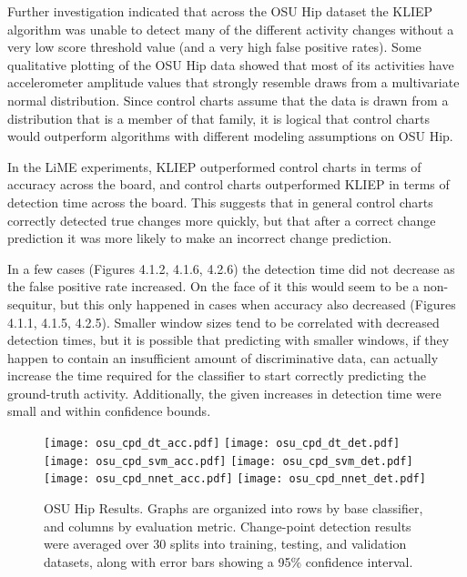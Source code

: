 Further investigation indicated that across the OSU Hip dataset the KLIEP algorithm
was unable to detect many of the different activity changes without a very low score
threshold value (and a very high false positive rates).
Some qualitative plotting of the OSU Hip data showed
that most of its activities have accelerometer amplitude values that strongly
resemble draws from a multivariate normal distribution. Since control charts
assume that the data is drawn from a distribution that is a member of that
family, it is logical that control charts would outperform algorithms with
different modeling assumptions on OSU Hip.

In the LiME experiments, KLIEP outperformed control charts in terms of
accuracy across the board, and control charts outperformed KLIEP in terms of
detection time across the board. This suggests that in general control charts
correctly detected true changes more quickly, but that after a correct change
prediction it was more likely to make an incorrect change prediction.

In a few cases (Figures 4.1.2, 4.1.6, 4.2.6) the detection time did
not decrease as the false positive rate increased. On the face of it this would seem
to be a non-sequitur, but this only happened in cases when accuracy also decreased
(Figures 4.1.1, 4.1.5, 4.2.5).
Smaller window sizes tend to be correlated with decreased detection times, but
it is possible that predicting with smaller windows, if they happen to contain
an insufficient amount of discriminative data,
can actually increase the time required for the classifier to start correctly
predicting the ground-truth activity. Additionally, the given increases in detection
time were small and within confidence bounds.

\begin{figure}[H]
 \texttt{[image: osu\_cpd\_dt\_acc.pdf]} \hspace{1em}\vspace{1em}
 \texttt{[image: osu\_cpd\_dt\_det.pdf]}
 \texttt{[image: osu\_cpd\_svm\_acc.pdf]} \hspace{1em}\vspace{1em}
 \texttt{[image: osu\_cpd\_svm\_det.pdf]}
 \texttt{[image: osu\_cpd\_nnet\_acc.pdf]} \hspace{2em}
 \texttt{[image: osu\_cpd\_nnet\_det.pdf]}
 \caption{OSU Hip Results. Graphs are organized into rows by base classifier,
  and columns by evaluation metric. Change-point detection results were averaged over
  30 splits into training, testing, and validation datasets,
  along with error bars showing a 95\% confidence interval.}
 \label{fig:osu_cpd}
\end{figure}

